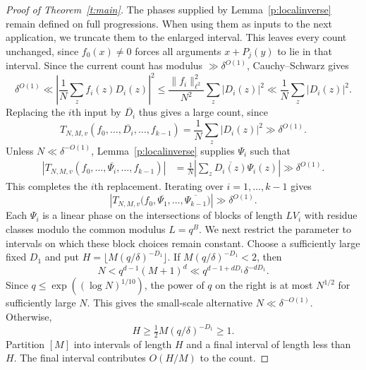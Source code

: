 \documentclass[12pt]{amsart}
\newcommand{\1}{\mathbf 1}
\theoremstyle{definition}
\begin{document}
\begin{proof}[Proof of Theorem~\ref{t:main}]
The phases supplied by Lemma~\ref{p:localinverse} remain
defined on full progressions. When using them as inputs to the
next application, we truncate them to the enlarged interval.
This leaves every count unchanged, since $f_0(x)\ne0$ forces all
arguments $x+P_j(y)$ to lie in that interval.
Since the current count has modulus $\gg\delta^{O(1)}$,
Cauchy--Schwarz gives
\[
 \delta^{O(1)}
 \ll \left|\frac1N\sum_z f_i(z)D_i(z)\right|^2
 \leq \frac{\|f_i\|_{\ell^2}^2}{N^2}\sum_z|D_i(z)|^2
 \ll \frac1N\sum_z|D_i(z)|^2.
\]
Replacing the $i$th input by $\overline{D_i}$ thus gives a
large count, since
\[
 T_{N,M,v}(f_0,\ldots,\overline{D_i},\ldots,f_{k-1})
 =\frac1N\sum_z|D_i(z)|^2
 \gg\delta^{O(1)}.
\]
Unless $N\ll\delta^{-O(1)}$, Lemma~\ref{p:localinverse} supplies
$\Psi_i$ such that
\[
\begin{aligned}
 \left|T_{N,M,v}
       (f_0,\ldots,\overline{\Psi_i},\ldots,f_{k-1})\right|
 &=\frac1N\left|\sum_z\overline{D_i(z)}\Psi_i(z)\right|
 \gg\delta^{O(1)}.
\end{aligned}
\]
This completes the $i$th replacement. Iterating over
$i=1,\ldots,k-1$ gives
\[
 \left|T_{N,M,v}
 \bigl(f_0,\overline{\Psi_1},\ldots,\overline{\Psi_{k-1}}\bigr)\right|
 \gg\delta^{O(1)}.
\] Each $\Psi_i$ is
a linear phase on the intersections of blocks of length $LV_i$
with residue classes modulo the common modulus $L=q^B$.
We next restrict the parameter to intervals on which these block
choices remain constant. Choose a sufficiently large fixed $D_1$
and put $H=\lfloor M(q/\delta)^{-D_1}\rfloor$. If
$M(q/\delta)^{-D_1}<2$, then
\[
 N<q^{d-1}(M+1)^d
 \ll q^{d-1+dD_1}\delta^{-dD_1}.
\]
Since $q\leq\exp((\log N)^{1/10})$, the power of $q$ on the
right is at most $N^{1/2}$ for sufficiently large $N$. This
gives the small-scale alternative $N\ll\delta^{-O(1)}$.
Otherwise,
\[
 H\geq \tfrac12 M(q/\delta)^{-D_1}\geq1.
\]
Partition $[M]$ into intervals of length $H$ and a final interval
of length less than $H$. The final interval contributes $O(H/M)$
to the count.


\end{proof}
\end{document}
